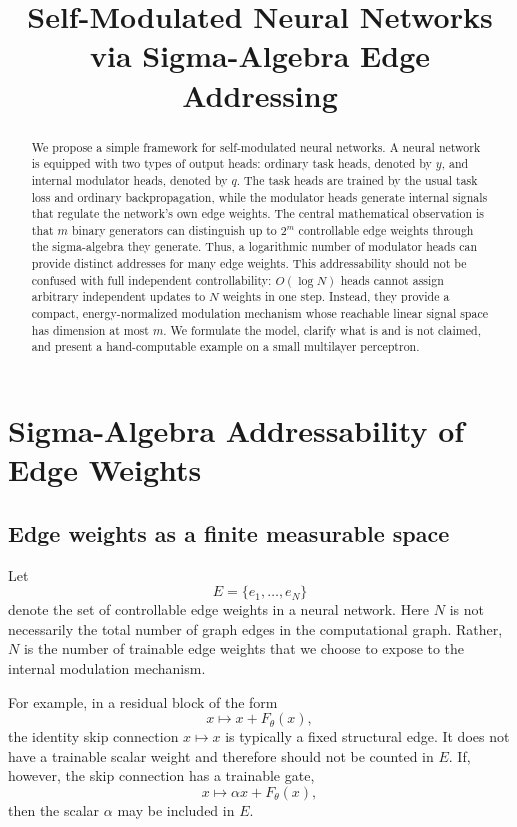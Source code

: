\documentclass[11pt]{article}
\title{Self-Modulated Neural Networks via Sigma-Algebra Edge Addressing}
\author{}
\date{}
\newcommand{\1}{\mathbf{1}}
\begin{document}
\maketitle

\begin{abstract}
We propose a simple framework for self-modulated neural networks. A neural network is equipped with two types of output heads: ordinary task heads, denoted by \(y\), and internal modulator heads, denoted by \(q\). The task heads are trained by the usual task loss and ordinary backpropagation, while the modulator heads generate internal signals that regulate the network's own edge weights. The central mathematical observation is that \(m\) binary generators can distinguish up to \(2^m\) controllable edge weights through the sigma-algebra they generate. Thus, a logarithmic number of modulator heads can provide distinct addresses for many edge weights. This addressability should not be confused with full independent controllability: \(O(\log N)\) heads cannot assign arbitrary independent updates to \(N\) weights in one step. Instead, they provide a compact, energy-normalized modulation mechanism whose reachable linear signal space has dimension at most \(m\). We formulate the model, clarify what is and is not claimed, and present a hand-computable example on a small multilayer perceptron.
\end{abstract}

\section{Sigma-Algebra Addressability of Edge Weights}

\subsection{Edge weights as a finite measurable space}

Let
\[
E=\{e_1,\dots,e_N\}
\]
denote the set of controllable edge weights in a neural network. Here \(N\) is not necessarily the total number of graph edges in the computational graph. Rather, \(N\) is the number of trainable edge weights that we choose to expose to the internal modulation mechanism.

For example, in a residual block of the form
\[
x \mapsto x+F_\theta(x),
\]
the identity skip connection \(x\mapsto x\) is typically a fixed structural edge. It does not have a trainable scalar weight and therefore should not be counted in \(E\). If, however, the skip connection has a trainable gate,
\[
x \mapsto \alpha x+F_\theta(x),
\]
then the scalar \(\alpha\) may be included in \(E\).
\end{document}
